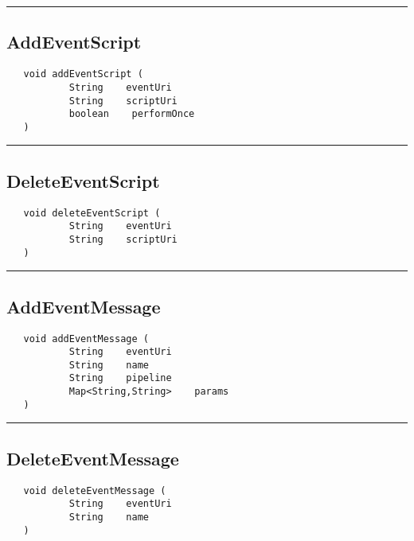 \rule{15cm}{2pt}
\subsection{AddEventScript}
\label{Api:AddEventScript}
\begin{verbatim}
   void addEventScript (
           String    eventUri
           String    scriptUri
           boolean    performOnce
   )
\end{verbatim}



\rule{15cm}{2pt}
\subsection{DeleteEventScript}
\label{Api:DeleteEventScript}
\begin{verbatim}
   void deleteEventScript (
           String    eventUri
           String    scriptUri
   )
\end{verbatim}



\rule{15cm}{2pt}
\subsection{AddEventMessage}
\label{Api:AddEventMessage}
\begin{verbatim}
   void addEventMessage (
           String    eventUri
           String    name
           String    pipeline
           Map<String,String>    params
   )
\end{verbatim}



\rule{15cm}{2pt}
\subsection{DeleteEventMessage}
\label{Api:DeleteEventMessage}
\begin{verbatim}
   void deleteEventMessage (
           String    eventUri
           String    name
   )
\end{verbatim}



